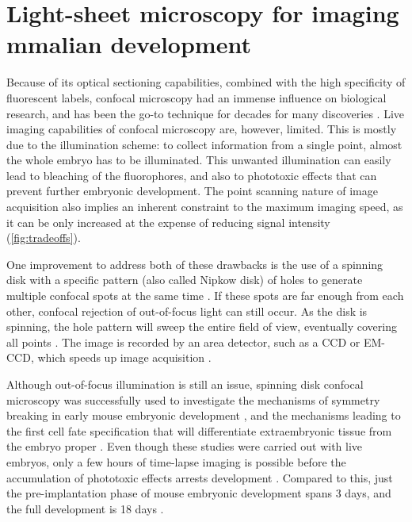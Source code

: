 \section{Light-sheet microscopy for imaging mmalian development}

  Because of its optical sectioning capabilities, combined with the high specificity of fluorescent labels, confocal microscopy had an immense influence on biological research, and has been the go-to technique for decades for many discoveries \cite{shotton_confocal_1989,graf_live_2005,jonkman_any_2015}.
  Live imaging capabilities of confocal microscopy are, however, limited. This is mostly due to the illumination scheme: to collect information from a single point, almost the whole embryo has to be illuminated. This unwanted illumination can easily lead to bleaching of the fluorophores, and also to phototoxic effects that can prevent further embryonic development. The point scanning nature of image acquisition also implies an inherent constraint to the maximum imaging speed, as it can be only increased at the expense of reducing signal intensity (\autoref{fig:tradeoffs}).

  One improvement to address both of these drawbacks is the use of a spinning disk with a specific pattern (also called Nipkow disk) of holes to generate multiple confocal spots at the same time \cite{graf_live_2005}. If these spots are far enough from each other, confocal rejection of out-of-focus light can still occur. As the disk is spinning, the hole pattern will sweep the entire field of view, eventually covering all points \cite{kino_intermediate_1990}. The image is recorded by an area detector, such as a CCD or EM-CCD, which speeds up image acquisition \cite{nakano_spinning-disk_2002}.

  Although out-of-focus illumination is still an issue, spinning disk confocal microscopy was successfully used to investigate the mechanisms of symmetry breaking in early mouse embryonic development \cite{korotkevich_apical_2017}, and the mechanisms leading to the first cell fate specification that will differentiate extraembryonic tissue from the embryo proper \cite{maitre_pulsatile_2015,dietrich_venus_2015,maitre_asymmetric_2016}. Even though these studies were carried out with live embryos, only a few hours of time-lapse imaging is possible before the accumulation of phototoxic effects arrests development \cite{nowotschin_chapter_2010}. Compared to this, just the pre-implantation phase of mouse embryonic development spans 3 days, and the full development is 18 days \cite{wolpert_principles_2011}.


